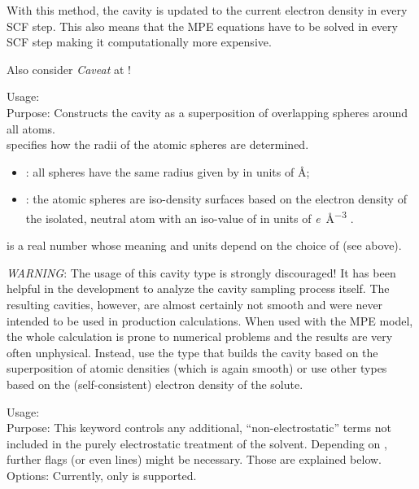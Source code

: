With this method, the cavity is updated to the current electron 
density in every SCF step. This also means that the MPE equations 
have to be solved in every SCF step making it computationally 
more expensive.

Also consider \emph{Caveat} at !

{
  \noindent
  Usage:  
      \\[1.0ex] 
  Purpose: Constructs the cavity as a superposition of overlapping 
    spheres around all atoms. \\[1.0ex]
   specifies how the radii of the atomic spheres 
    are determined.
    \begin{itemize}
    \item {}: all spheres have the same radius
      given by  in units of \si{\angstrom};
    \item {}: the atomic spheres are iso-density surfaces 
      based on the electron density of the isolated, neutral atom 
      with an iso-value of  in units of 
      \si{\elementarycharge\per\cubic\angstrom} .
    \end{itemize} %
   is a real number whose meaning and units
    depend on the choice of  (see above). \\
}
\emph{WARNING}: The usage of this cavity type is strongly discouraged! 
It has been helpful in the development to analyze the cavity sampling 
process itself. The resulting cavities, however, are almost certainly 
not smooth and were never intended to be used in production calculations.
When used with the MPE model, the whole calculation is prone to numerical 
problems and the results are very often unphysical. 
Instead, use the  type that builds the cavity based on the
superposition of atomic densities (which is again smooth) or use other 
types based on the (self-consistent) electron density of the solute. 


{
  \noindent
  Usage:   \\[1.0ex] 
  Purpose: This keyword controls any additional, ``non-electrostatic'' terms 
    not included in the purely electrostatic treatment of the solvent. 
    Depending on , further flags (or even lines) might be 
    necessary. Those are explained below. \\[1.0ex]
  Options: Currently, only  is supported. \\
}

